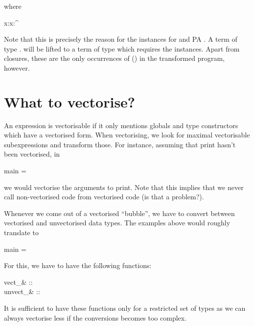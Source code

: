 \documentclass{article}
\begin{document}
where

\begin{haskell}
x:\sigma\in\Gamma \Longleftrightarrow x:\parr{\vect{\sigma}}\in\Gamma^\uparrow
\end{haskell}

Note that this is precisely the reason for the \<\parr{\cdot}\> instances for
\<\alpha\to\beta\> and \<PA \alpha\>. A term of type \<\forall\alpha.\sigma\>
will be lifted to a term of type
\<\> which requires the
instances. Apart from closures, these are the only occurrences of \<({\to})\> in
the transformed program, however.


\section*{What to vectorise?}

An expression is vectorisable if it only mentions globals and type constructors
which have a vectorised form. When vectorising, we look for maximal
vectorisable subexpressions and transform those. For instance, assuming that
\<print\> hasn't been vectorised, in

\begin{haskell}
main = 
\end{haskell}

we would vectorise the arguments to \<print\>.  Note that this implies that we
never call non-vectorised code from vectorised code (is that a problem?).

Whenever we come out of a vectorised ``bubble'', we have to convert between
vectorised and unvectorised data types. The examples above would roughly
translate to

\begin{haskell}
main = 
\end{haskell}

For this, we have to have the following functions:

\begin{haskell}
vect_\sigma & :: \sigma\to\vect{\sigma} \\
unvect_\sigma & :: \vect{\sigma}\to\sigma
\end{haskell}

It is sufficient to have these functions only for a restricted set of types as
we can always vectorise less if the conversions becomes too complex.
\end{document}
